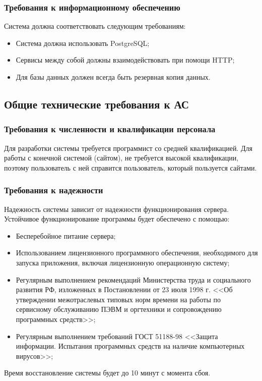 {\subsubsection{Требования к информационному обеспечению}
Система должна соответствовать следующим требованиям:
\begin{itemize}
  \item Система должна использовать PostgreSQL;
  \item Сервисы между собой должны взаимодействовать при помощи HTTP;
  \item Для базы данных должен всегда быть резервная копия данных.
\end{itemize}

\subsection{Общие технические требования к АС}
\subsubsection{Требования к численности и квалификации персонала}
Для разработки системы требуется программист со средней квалификацией. Для
работы с конечной системой (сайтом), не требуется высокой квалификации, поэтому
пользователь с ней справится пользователь, который пользуется сайтами.
\subsubsection{Требования к надежности}
Надежность системы зависит от надежности функционирования сервера. Устойчивое
функционирование программы будет обеспечено с помощью:
\begin{itemize}
  \item Бесперебойное питание сервера;
  \item Использованием лицензионного программного обеспечения, необходимого для
        запуска приложения, включая лицензионную операционную систему;
  \item Регулярным выполнением рекомендаций Министерства труда и социального развития РФ, изложенных в Постановлении от 23 июля 1998 г. <<Об утверждении межотраслевых типовых норм времени на работы по сервисному обслуживанию ПЭВМ и оргтехники и сопровождению программных средств>>;
  \item Регулярным выполнением требований ГОСТ 51188-98 <<Защита информации. Испытания программных средств на наличие компьютерных вирусов>>;
\end{itemize}
Время восстановление системы будет до 10 минут с момента сбоя.
}
